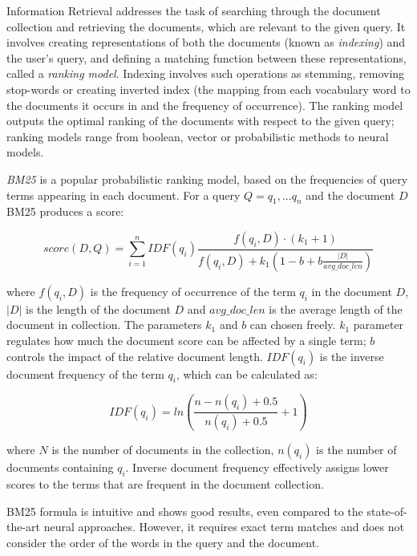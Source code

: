 Information Retrieval addresses the task of searching through the document collection and retrieving the documents, which are relevant to the given query. It involves creating representations of both the documents (known as \textit{indexing}) and the user's query, and defining a matching function between these representations, called a \textit{ranking model}. Indexing involves such operations as stemming, removing stop-words or creating inverted index (the mapping from each vocabulary word to the documents it occurs in and the frequency of occurrence). The ranking model outputs the optimal ranking of the documents with respect to the given query; ranking models range from boolean, vector or probabilistic methods to neural models. 

\textit{BM25} \cite{robertson1995okapi} is a popular probabilistic ranking model, based on the frequencies of query terms appearing in each document. For a query $Q=q_1,... q_n$ and the document $D$ BM25 produces a score:

\begin{equation}
    score(D, Q) = \sum_{i=1}^n IDF(q_i) \frac{f(q_i,D) \cdot (k_1 + 1)}{f(q_i, D) + k_1 (1 - b + b\frac{|D|}{avg\_doc\_len})}
\end{equation}

where $f(q_i, D)$ is the frequency of occurrence of the term $q_i$ in the document $D$, $|D|$ is the length of the document $D$ and $avg\_doc\_len$ is the average length of the document in collection. The parameters $k_1$ and $b$ can chosen freely. $k_1$ parameter regulates how much the document score can be affected by a single term; $b$ controls the impact of the relative document length. $IDF(q_i)$ is the inverse document frequency of the term $q_i$, which can be calculated as:

\begin{equation}
    IDF(q_i) = ln \left ( \frac{n - n(q_i)+0.5}{n(q_i) + 0.5} + 1 \right )
\end{equation}

where $N$ is the number of documents in the collection, $n(q_i)$ is the number of documents containing $q_i$. Inverse document frequency effectively assigns lower scores to the terms that are frequent in the document collection.

BM25 formula is intuitive and shows good results, even compared to the state-of-the-art neural approaches. However, it requires exact term matches and does not consider the order of the words in the query and the document.

